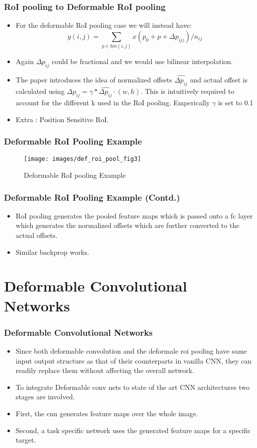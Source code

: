 \documentclass{beamer}
\begin{document}
\begin{frame}
  \frametitle{RoI pooling to Deformable RoI pooling}
  \begin{itemize}
  \item For the deformable RoI pooling case we will instead have: $$y(i, j) = \sum_{p \in bin(i,j)}x(p_0 + p + \Delta p_{ij)})/n_{ij}$$
  \item Again $\Delta p_{ij}$ could be fractional and we would use bilinear interpolation.
  \item The paper introduces the idea of normalized offsets $\hat{\Delta{p_{ij}}}$ and actual offset is calculated using $\Delta p_{ij} = \gamma *  \hat{\Delta{p_{ij}}} \cdot(w, h)$. This is intuitively required to account for the different k used in the RoI pooling. Emperically $\gamma$ is set to 0.1
  \item Extra : Position Sensitive RoI.
  \end{itemize}
\end{frame}

\begin{frame}
  \frametitle{Deformable RoI Pooling Example}
  \begin{figure}[H]
    \centering
    \texttt{[image: images/def\_roi\_pool\_fig3]}
    \caption{Deformable RoI pooling Example}
    \label{fig:dfroif3}
  \end{figure}
\end{frame}

\begin{frame}
  \frametitle{Deformable RoI Pooling Example (Contd.)}
  \begin{itemize}
  \item RoI pooling generates the pooled feature maps which is passed onto a fc layer which generates the normalized offsets which are further converted to the actual offsets.
  \item Similar backprop works.
  \end{itemize}
\end{frame}

\section{Deformable Convolutional Networks}
\begin{frame}
  \frametitle{Deformable Convolutional Networks}
  \begin{itemize}
  \item Since both deformable convolution and the deformale roi pooling have same input output structure as that of their counterparts in vanilla CNN, they can readily replace them without affecting the overall network.
  \item To integrate Deformable conv nets to state of the art CNN architectures two stages are involved.
  \item First, the cnn generates feature maps over the whole image.
  \item Second, a task specific network uses the generated feature maps for a specific target.
  \end{itemize}
\end{frame}
\end{document}
